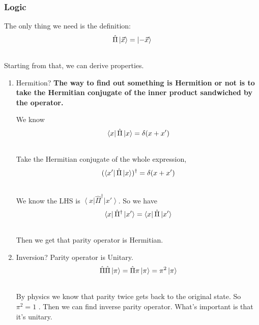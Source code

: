 \documentclass[letterpaper,10pt,english]{sphinxmanual}
\newcommand{\bra}[1]{\left\langle #1\right|}
\newcommand{\ket}[1]{\left| #1\right\rangle}
\begin{document}
\subsubsection{Logic}
\label{symmetries:logic}
The only thing we need is the definition:
\begin{gather}
\begin{split}\hat \Pi \ket{\vec x} = \ket{-\vec x}\end{split}\notag\\\begin{split}\end{split}\notag
\end{gather}
Starting from that, we can derive properties.
\begin{enumerate}
\item {} 
Hermition? \textbf{The way to find out something is Hermition or not is to take the Hermitian conjugate of the inner product sandwiched by the operator.}

We know
\begin{gather}
\begin{split}\bra{x}\hat \Pi \ket{x} = \delta(x+x')\end{split}\notag\\\begin{split}\end{split}\notag
\end{gather}
Take the Hermitian conjugate of the whole expression,
\begin{gather}
\begin{split}(\bra{x'}\hat \Pi \ket{x} )^\dagger = \delta(x+x')\end{split}\notag\\\begin{split}\end{split}\notag
\end{gather}
We know the LHS is $\bra{x}\hat \Pi^\dagger \ket{x'}$. So we have
\begin{gather}
\begin{split}\bra{x}\hat \Pi^\dagger \ket{x'}  =  \bra{x}\hat \Pi \ket{x'}\end{split}\notag\\\begin{split}\end{split}\notag
\end{gather}
Then we get that parity operator is Hermitian.

\item {} 
Inversion? Parity operator is Unitary.
\begin{gather}
\begin{split}\hat \Pi \hat \Pi \ket{\pi} = \hat \Pi \pi \ket{\pi} = \pi^2\ket{\pi}\end{split}\notag\\\begin{split}\end{split}\notag
\end{gather}
By physics we know that parity twice gets back to the original state. So $\pi^2=1$ . Then we can find inverse parity operator. What's important is that it's unitary.


\end{enumerate}
\end{document}
